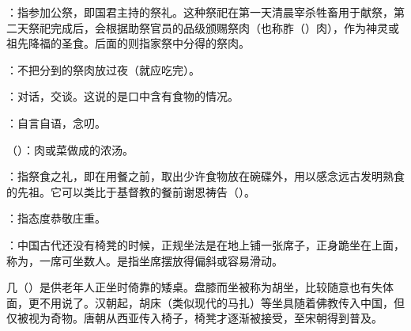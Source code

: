 {
\item {}：指参加公祭，即国君主持的祭礼。这种祭祀在第一天清晨宰杀牲畜用于献祭，第二天祭祀完成后，会根据助祭官员的品级颁赐祭肉（也称胙（）肉），作为神灵或祖先降福的圣食。后面的则指家祭中分得的祭肉。
\item {}：不把分到的祭肉放过夜（就应吃完）。
}
{}


{
\item {}：对话，交谈。这说的是口中含有食物的情况。

：自言自语，念叨。%
}
{}


{
\item {}（）：肉或菜做成的浓汤。
\item {}：指祭食之礼，即在用餐之前，取出少许食物放在碗碟外，用以感念远古发明熟食的先祖。它可以类比于基督教的餐前谢恩祷告（）。
\item {}：指态度恭敬庄重。
}
{}


{
\item {}：中国古代还没有椅凳的时候，正规坐法是在地上铺一张席子，正身跪坐在上面，称为，一席可坐数人。是指坐席摆放得偏斜或容易滑动。

几（）是供老年人正坐时倚靠的矮桌。盘膝而坐被称为胡坐，比较随意也有失体面，更不用说了。汉朝起，胡床（类似现代的马扎）等坐具随着佛教传入中国，但仅被视为奇物。唐朝从西亚传入椅子，椅凳才逐渐被接受，至宋朝得到普及。
}
{}



